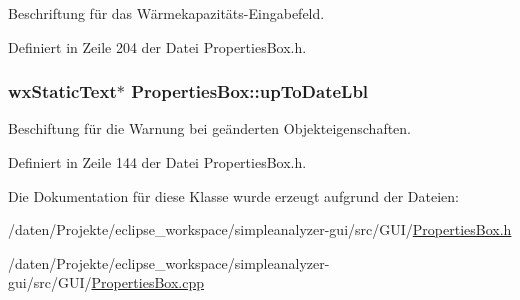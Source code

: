 Beschriftung für das Wärmekapazitäts-\/\-Eingabefeld. 



Definiert in Zeile 204 der Datei Properties\-Box.\-h.

\hypertarget{classPropertiesBox_acd0a5ccaa4e981b961685c5714e67f92}{
\subsubsection[{up\-To\-Date\-Lbl}]{\setlength{\rightskip}{0pt plus 5cm}wx\-Static\-Text$\ast$ Properties\-Box\-::up\-To\-Date\-Lbl\hspace{0.3cm}{\ttfamily [private]}}}\label{classPropertiesBox_acd0a5ccaa4e981b961685c5714e67f92}


Beschiftung für die Warnung bei geänderten Objekteigenschaften. 



Definiert in Zeile 144 der Datei Properties\-Box.\-h.



Die Dokumentation für diese Klasse wurde erzeugt aufgrund der Dateien\-:\begin{DoxyCompactItemize}
\item 
/daten/\-Projekte/eclipse\-\_\-workspace/simpleanalyzer-\/gui/src/\-G\-U\-I/\hyperlink{PropertiesBox_8h}{Properties\-Box.\-h}\item 
/daten/\-Projekte/eclipse\-\_\-workspace/simpleanalyzer-\/gui/src/\-G\-U\-I/\hyperlink{PropertiesBox_8cpp}{Properties\-Box.\-cpp}\end{DoxyCompactItemize}
